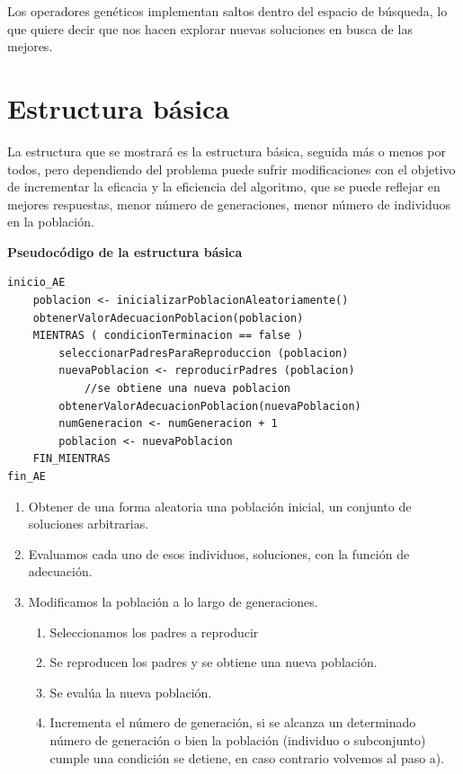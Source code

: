 \documentclass[12pt, twoside, openright]{report} %
\begin{document}
Los operadores genéticos implementan saltos dentro del espacio de búsqueda, lo que quiere decir que nos hacen explorar nuevas soluciones en busca de las mejores.

\section{Estructura básica}
La estructura que se mostrará es la estructura básica, seguida más o menos por todos, pero dependiendo del problema puede sufrir modificaciones con el objetivo de incrementar la eficacia y la eficiencia del algoritmo, que se puede reflejar en mejores respuestas, menor número de generaciones, menor número de individuos en la población.

\textbf{Pseudocódigo de la estructura básica}
\begin{lstlisting}
inicio_AE
	poblacion <- inicializarPoblacionAleatoriamente()
	obtenerValorAdecuacionPoblacion(poblacion)
	MIENTRAS ( condicionTerminacion == false )
		seleccionarPadresParaReproduccion (poblacion)
		nuevaPoblacion <- reproducirPadres (poblacion)
			//se obtiene una nueva poblacion
		obtenerValorAdecuacionPoblacion(nuevaPoblacion)
		numGeneracion <- numGeneracion + 1
		poblacion <- nuevaPoblacion
  	FIN_MIENTRAS
fin_AE
\end{lstlisting}
\begin{enumerate}
	\item Obtener de una forma aleatoria una población inicial, un conjunto de soluciones arbitrarias.
	\item Evaluamos cada uno de esos individuos, soluciones, con la función de adecuación.
	\item Modificamos la población a lo largo de generaciones.
	      \begin{enumerate}
		      \item Seleccionamos los padres a reproducir
		      \item Se reproducen los padres y se obtiene una nueva población.
		      \item Se evalúa la nueva población.
		      \item Incrementa el número de generación, si se alcanza un determinado número de generación o bien la población (individuo o subconjunto) cumple una condición se detiene, en caso contrario volvemos al paso a).
	      \end{enumerate}
\end{enumerate}
\end{document}
